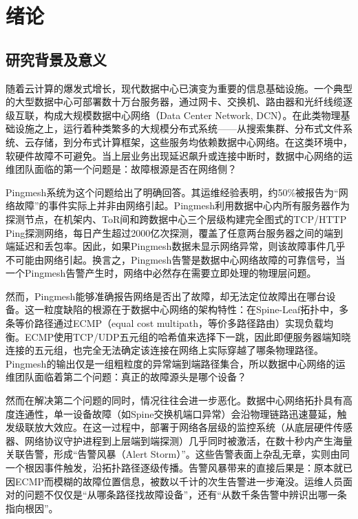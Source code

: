 
\chapter{绪论}

\section{研究背景及意义}

随着云计算的爆发式增长，现代数据中心已演变为重要的信息基础设施。一个典型的大型数据中心可部署数十万台服务器，通过网卡、交换机、路由器和光纤线缆逐级互联，构成大规模数据中心网络（Data Center Network, DCN）。在此类物理基础设施之上，运行着种类繁多的大规模分布式系统——从搜索集群、分布式文件系统、云存储，到分布式计算框架，这些服务均依赖数据中心网络。在这类环境中，软硬件故障不可避免。当上层业务出现延迟飙升或连接中断时，数据中心网络的运维团队面临的第一个问题是：故障根源是否在网络侧？

Pingmesh系统为这个问题给出了明确回答。其运维经验表明，约50\%被报告为“网络故障”的事件实际上并非由网络引起。Pingmesh利用数据中心内所有服务器作为探测节点，在机架内、ToR间和跨数据中心三个层级构建完全图式的TCP/HTTP Ping探测网络，每日产生超过2000亿次探测，覆盖了任意两台服务器之间的端到端延迟和丢包率。因此，如果Pingmesh数据未显示网络异常，则该故障事件几乎不可能由网络引起。换言之，Pingmesh告警是数据中心网络故障的可靠信号，当一个Pingmesh告警产生时，网络中必然存在需要立即处理的物理层问题。

然而，Pingmesh能够准确报告网络是否出了故障，却无法定位故障出在哪台设备。这一粒度缺陷的根源在于数据中心网络的架构特性：在Spine-Leaf拓扑中，多条等价路径通过ECMP（equal cost multipath，等价多路径路由）实现负载均衡。ECMP使用TCP/UDP五元组的哈希值来选择下一跳，因此即便服务器端知晓连接的五元组，也完全无法确定该连接在网络上实际穿越了哪条物理路径。Pingmesh的输出仅是一组粗粒度的异常端到端路径集合，所以数据中心网络的运维团队面临着第二个问题：真正的故障源头是哪个设备？

然而在解决第二个问题的同时，情况往往会进一步恶化。数据中心网络拓扑具有高度连通性，单一设备故障（如Spine交换机端口异常）会沿物理链路迅速蔓延，触发级联放大效应。在这一过程中，部署于网络各层级的监控系统（从底层硬件传感器、网络协议守护进程到上层端到端探测）几乎同时被激活，在数十秒内产生海量关联告警，形成“告警风暴（Alert Storm）”。这些告警表面上杂乱无章，实则由同一个根因事件触发，沿拓扑路径逐级传播。告警风暴带来的直接后果是：原本就已因ECMP而模糊的故障位置信息，被数以千计的次生告警进一步淹没。运维人员面对的问题不仅仅是“从哪条路径找故障设备”，还有“从数千条告警中辨识出哪一条指向根因”。

